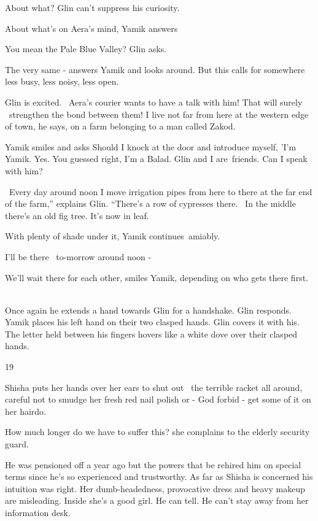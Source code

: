 \documentclass[letterpaper]{article}
\begin{document}
{\textquotedbl}About what?{\textquotedbl} Glin can't suppress his curiosity.

{\textquotedbl}About what's on Aera's mind,{\textquotedbl} Yamik answers 

{\textquotedbl}You mean the Pale Blue Valley?{\textquotedbl} Glin asks. 

{\textquotedbl}The very same -{\textquotedbl} answers Yamik and looks around. {\textquotedbl}But this calls for
somewhere less busy, less noisy, less open.{\textquotedbl} 

Glin is excited. \ Aera's courier wants to have a talk with him! That will surely \ strengthen the bond between them!
{\textquotedbl}I live not far from here at the western edge of town,{\textquotedbl} he says, {\textquotedbl}on a farm
belonging to a man called Zakod.{\textquotedbl} 

Yamik smiles and asks {\textquotedbl}Should I knock at the door and introduce myself, 'I'm Yamik. Yes. You guessed
right, I'm a Balad. Glin and I are~friends. Can I speak with him?{\textquotedbl} 

\ {\textquotedbl}Every day around noon I move irrigation pipes from here to there at the far end of the farm,'' explains
Glin. ``There's a row of cypresses there. ~In the middle there's an old fig tree. It's now in leaf.{\textquotedbl} 

{\textquotedbl}With plenty of shade under it,{\textquotedbl} Yamik continues~amiably. 

{\textquotedbl}I'll be there \ to-morrow around noon -{\textquotedbl}

{\textquotedbl}We'll wait there for each other,{\textquotedbl} smiles Yamik, {\textquotedbl}depending on who gets there
first.{\textquotedbl} ~

Once again he extends a hand towards Glin for a handshake. Glin responds. Yamik places his left hand on their two
clasped hands. Glin covers it with his. The letter held between his fingers hovers like a white dove over their clasped
hands.


\bigskip

19 

Shisha puts her hands over her ears to shut out \ the terrible racket all around, careful not to smudge her fresh red
nail polish or - God forbid - get some of it on her hairdo. 

{\textquotedbl}How much longer do we have to suffer this?{\textquotedbl} she complains to the elderly security guard.

He was pensioned off a year ago but the powers that be rehired him on special terms since he's so experienced and
trustworthy. As far as Shisha is concerned his intuition was right. Her dumb-headedness, provocative dress and heavy
makeup are misleading. Inside she's a good girl. He can tell. He can't stay away from her information desk.
\end{document}
